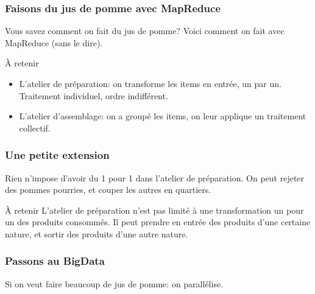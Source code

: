 \begin{frame}[fragile]
\frametitle{Faisons du jus de pomme avec MapReduce}

Vous savez comment on fait du jus de pomme? Voici comment
on fait  avec MapReduce (sans le dire).


\begin{defblock}{À retenir}

\begin{itemize}
  \item \alert{L'atelier de préparation}: on transforme les items en entrée, un par un.
        \alert{Traitement individuel, ordre indifférent.}
        
  \item \alert{L'atelier d'assemblage}: on a \alert{groupé} les items, on leur applique
   un \alert{traitement collectif}.
\end{itemize}
\end{defblock}
\end{frame}



\begin{frame}[fragile]
\frametitle{Une petite extension}

Rien n'impose d'avoir du 1 pour 1 dans l'atelier de préparation. On peut
rejeter des pommes pourries, et couper les autres en quartiers.


\begin{defblock}{À retenir}
L'atelier de préparation n'est pas limité à une transformation un pour un des produits consommés.
   Il peut prendre en entrée des produits d'une certaine nature, et sortir
   des produits d'une autre nature.
\end{defblock}
\end{frame}


\begin{frame}[fragile]
\frametitle{Passons au BigData}

Si on veut faire beaucoup de jus de pomme: on parallélise.



\end{frame}




